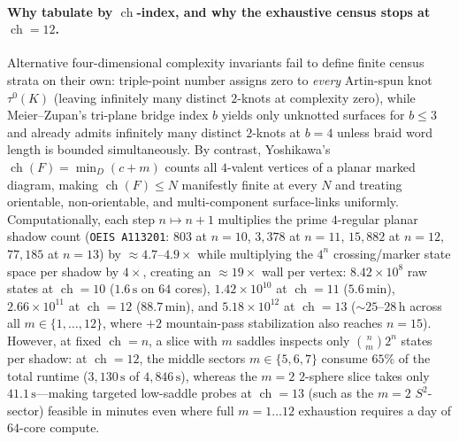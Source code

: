 \documentclass[11pt]{amsart}
\newcommand{\ch}{\operatorname{ch}}
\theoremstyle{plain}
\theoremstyle{remark}
\begin{document}
\paragraph{Why tabulate by $\ch$-index, and why the exhaustive census stops at $\ch=12$.}
Alternative four-dimensional complexity invariants fail to define finite census strata on their own:
triple-point number assigns zero to \emph{every} Artin-spun knot $\tau^0(K)$ (leaving infinitely many distinct
$2$-knots at complexity zero), while Meier--Zupan's tri-plane bridge index $b$ yields only unknotted surfaces
for $b\le 3$ and already admits infinitely many distinct $2$-knots at $b=4$ unless braid word length is bounded
simultaneously. By contrast, Yoshikawa's $\ch(F)=\min_D(c+m)$ counts all $4$-valent vertices of a planar marked
diagram, making $\ch(F)\le N$ manifestly finite at every $N$ and treating orientable, non-orientable, and
multi-component surface-links uniformly.
Computationally, each step $n\mapsto n+1$ multiplies the prime $4$-regular planar shadow count (\texttt{OEIS A113201}: $803$ at
$n=10$, $3{,}378$ at $n=11$, $15{,}882$ at $n=12$, $77{,}185$ at $n=13$) by $\approx 4.7$--$4.9\times$ while
multiplying the $4^n$ crossing/marker state space per shadow by $4\times$, creating an $\approx 19\times$
wall per vertex: $8.42\times 10^8$ raw states at $\ch=10$ ($1.6\,\mathrm{s}$ on $64$ cores),
$1.42\times 10^{10}$ at $\ch=11$ ($5.6\,\mathrm{min}$), $2.66\times 10^{11}$ at $\ch=12$ ($88.7\,\mathrm{min}$),
and $5.18\times 10^{12}$ at $\ch=13$ ($\sim 25$--$28\,\mathrm{h}$ across all $m\in\{1,\dots,12\}$, where $+2$
mountain-pass stabilization also reaches $n=15$). However, at fixed $\ch=n$, a slice with $m$ saddles inspects
only $\binom{n}{m}2^{n}$ states per shadow: at $\ch=12$, the middle sectors $m\in\{5,6,7\}$ consume $65\%$ of
the total runtime ($3{,}130\,\mathrm{s}$ of $4{,}846\,\mathrm{s}$), whereas the $m=2$ $2$-sphere slice takes
only $41.1\,\mathrm{s}$---making targeted low-saddle probes at $\ch=13$ (such as the $m=2$ $S^2$-sector)
feasible in minutes even where full $m=1\dots 12$ exhaustion requires a day of $64$-core compute.
\end{document}

